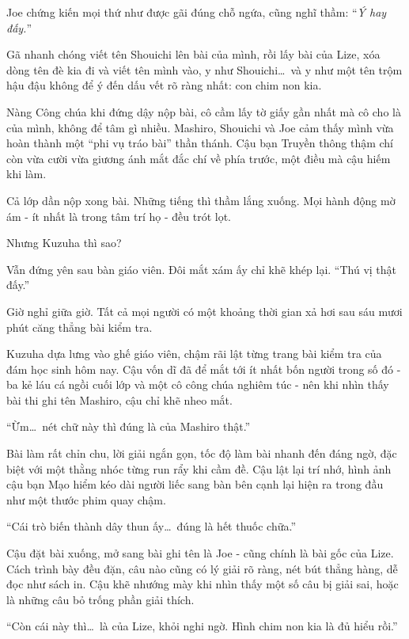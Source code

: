 \documentclass[../main.tex]{subfiles}
\begin{document}

Joe chứng kiến mọi thứ như được gãi đúng chỗ ngứa, cũng nghĩ thầm: ``\textit{Ý hay đấy.}''

Gã nhanh chóng viết tên Shouichi lên bài của mình, rồi lấy bài của Lize, xóa dòng tên đè kia đi và viết tên mình vào, y như Shouichi\dots\ và y như một tên trộm hậu đậu không để ý đến dấu vết rõ ràng nhất: con chim non kia.


Nàng Công chúa khi đứng dậy nộp bài, cô cầm lấy tờ giấy gần nhất mà cô cho là của mình, không để tâm gì nhiều. Mashiro, Shouichi và Joe cảm thấy mình vừa hoàn thành một ``phi vụ tráo bài'' thần thánh. Cậu bạn Truyền thông thậm chí còn vừa cười vừa giương ánh mắt đắc chí về phía trước, một điều mà cậu hiếm khi làm.

Cả lớp dần nộp xong bài. Những tiếng thì thầm lắng xuống. Mọi hành động mờ ám - ít nhất là trong tâm trí họ - đều trót lọt.

Nhưng Kuzuha thì sao?

Vẫn đứng yên sau bàn giáo viên. Đôi mắt xám ấy chỉ khẽ khép lại. ``Thú vị thật đấy.''

\ct

Giờ nghỉ giữa giờ. Tất cả mọi người có một khoảng thời gian xả hơi sau sáu mươi phút căng thẳng bài kiểm tra.

Kuzuha dựa lưng vào ghế giáo viên, chậm rãi lật từng trang bài kiểm tra của đám học sinh hôm nay. Cậu vốn dĩ đã để mắt tới ít nhất bốn người trong số đó - ba kẻ láu cá ngồi cuối lớp và một cô công chúa nghiêm túc - nên khi nhìn thấy bài thi ghi tên Mashiro, cậu chỉ khẽ nheo mắt.

``Ừm\dots\ nét chữ này thì đúng là của Mashiro thật.''

Bài làm rất chỉn chu, lời giải ngắn gọn, tốc độ làm bài nhanh đến đáng ngờ, đặc biệt với một thằng nhóc từng run rẩy khi cầm đề. Cậu lật lại trí nhớ, hình ảnh cậu bạn Mạo hiểm kéo dài người liếc sang bàn bên cạnh lại hiện ra trong đầu như một thước phim quay chậm.

``Cái trò biến thành dây thun ấy\dots\ đúng là hết thuốc chữa.''

Cậu đặt bài xuống, mở sang bài ghi tên là Joe - cũng chính là bài gốc của Lize. Cách trình bày đều đặn, câu nào cũng có lý giải rõ ràng, nét bút thẳng hàng, dễ đọc như sách in. Cậu khẽ nhướng mày khi nhìn thấy một số câu bị giải sai, hoặc là những câu bỏ trống phần giải thích.

``Còn cái này thì\dots\ là của Lize, khỏi nghi ngờ. Hình chim non kia là đủ hiểu rồi.''
\end{document}
